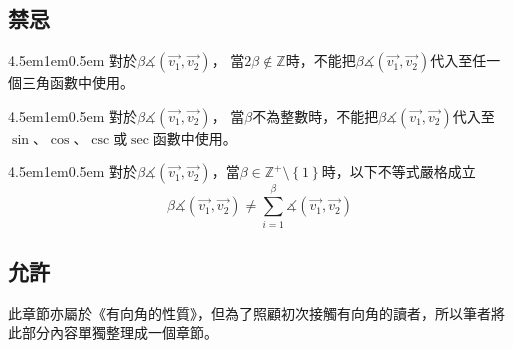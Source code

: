 \documentclass[12pt]{article}
\begin{document}
\subsection{禁忌}
\begin{mybox}[禁忌1]{4.5em}{1em}{0.5em}
    對於$\beta\measuredangle{\left(\overrightarrow{v_1},\overrightarrow{v_2}\right)}$，
    當$2\beta\notin\mathbb{Z}$時，不能把$\beta\measuredangle{\left(\overrightarrow{v_1},\overrightarrow{v_2}\right)}$代入至任一個三角函數中使用。
\end{mybox}
\begin{mybox}[禁忌2]{4.5em}{1em}{0.5em}
    對於$\beta\measuredangle{\left(\overrightarrow{v_1},\overrightarrow{v_2}\right)}$，
    當$\beta$不為整數時，不能把$\beta\measuredangle{\left(\overrightarrow{v_1},\overrightarrow{v_2}\right)}$代入至$\sin{}$、$\cos{}$、$\csc{}$或$\sec{}$函數中使用。
\end{mybox}
\begin{mybox}[禁忌3]{4.5em}{1em}{0.5em}
    對於$\beta\measuredangle{\left(\overrightarrow{v_1},\overrightarrow{v_2}\right)}$，當$\beta\in\mathbb{Z}^+\setminus\left\{1\right\}$時，以下不等式嚴格成立
    $$
        \beta\measuredangle{\left(\overrightarrow{v_1},\overrightarrow{v_2}\right)}
        \neq\sum\limits_{i=1}^{\beta}{\measuredangle{\left(\overrightarrow{v_1},\overrightarrow{v_2}\right)}}
    $$
\end{mybox}
\subsection{允許}
此章節亦屬於《有向角的性質》，但為了照顧初次接觸有向角的讀者，所以筆者將此部分內容單獨整理成一個章節。
\end{document}
